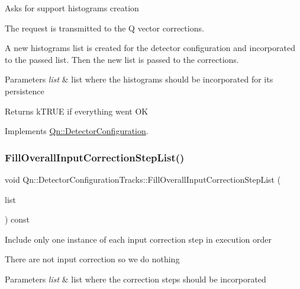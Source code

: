 Asks for support histograms creation

The request is transmitted to the Q vector corrections.

A new histograms list is created for the detector configuration and incorporated to the passed list. Then the new list is passed to the corrections. 
\begin{DoxyParams}{Parameters}
{\em list} & list where the histograms should be incorporated for its persistence \\
\hline
\end{DoxyParams}
\begin{DoxyReturn}{Returns}
k\+T\+R\+UE if everything went OK 
\end{DoxyReturn}


Implements \mbox{\hyperlink{classQn_1_1DetectorConfiguration_a8e5e2eef94bca58a3dcf34fe5fbd1429}{Qn\+::\+Detector\+Configuration}}.

\mbox{\label{classQn_1_1DetectorConfigurationTracks_a3ef9f093c8d272b48f7371b23eb3d498}} 
\subsubsection{\texorpdfstring{Fill\+Overall\+Input\+Correction\+Step\+List()}{FillOverallInputCorrectionStepList()}}
{\footnotesize\ttfamily void Qn\+::\+Detector\+Configuration\+Tracks\+::\+Fill\+Overall\+Input\+Correction\+Step\+List (\begin{DoxyParamCaption}\item[{T\+List $\ast$}]{list }\end{DoxyParamCaption}) const\hspace{0.3cm}{\ttfamily [virtual]}}

Include only one instance of each input correction step in execution order

There are not input correction so we do nothing 
\begin{DoxyParams}{Parameters}
{\em list} & list where the correction steps should be incorporated \\
\hline
\end{DoxyParams}


